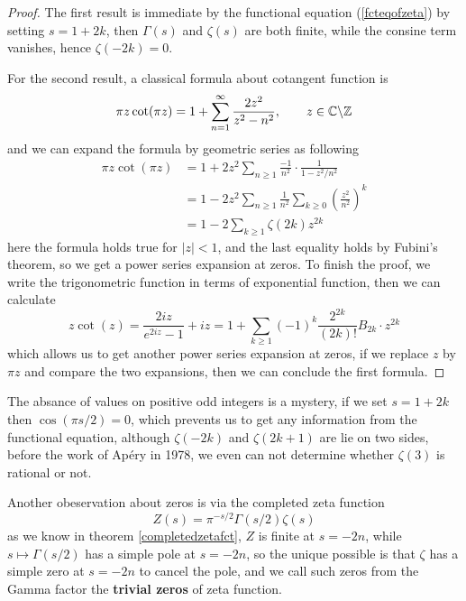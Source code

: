 \begin{proof}
    The first result is immediate by the functional equation (\ref{fcteqofzeta}) by setting \(s = 1+2k\), then \(\Gamma(s)\) and \(\zeta(s)\) are both finite, while the consine term vanishes, hence \(\zeta(-2k) = 0\). 
    
    For the second result, a classical formula about cotangent function is
    \[\pi z \cot(\pi z) = 1 + \sum_{n=1}^\infty \frac{2z^2}{z^2 - n^2}, \qquad z \in \mathbb{C} \backslash  \mathbb{Z}\]
    and we can expand the formula by geometric series as following
    \begin{align*}
        \pi z \cot(\pi z) &= 1 + 2z^2 \sum_{n\geq 1} \frac{-1}{n^2} \cdot \frac{1}{1 - z^2/n^2} \\
        &= 1 - 2z^2 \sum_{n\geq 1} \frac{1}{n^2} \sum_{k\geq 0} \left(\frac{z^2}{n^2}\right)^k \\
        &= 1 - 2 \sum_{k \geq 1} \zeta(2k) z^{2k}
    \end{align*}
    here the formula holds true for $|z|<1$, and the last equality holds by Fubini's theorem, so we get a power series expansion at zeros. To finish the proof, we write the trigonometric function in terms of exponential function, then we can calculate
    \[z \cot(z) = \frac{2iz}{e^{2iz} - 1} + iz = 1+ \sum_{k \geq 1} (-1)^k \frac{2^{2k}}{(2k)!}B_{2k} \cdot z^{2k}\]
    which allows us to get another power series expansion at zeros, if we replace $z$ by $\pi z$ and compare the two expansions, then we can conclude the first formula.
\end{proof}

\begin{remark}
    The absance of values on positive odd integers is a mystery, if we set \(s = 1+2k\) then \(\cos(\pi s/2)= 0\), which prevents us to get any information from the functional equation, although \(\zeta(-2k)\) and \(\zeta(2k+1)\) are lie on two sides, before the work of Apéry in 1978, we even can not determine whether \(\zeta(3)\) is rational or not.
\end{remark}

\begin{remark}
    Another obeservation about zeros is via the completed zeta function
    \[Z(s) = \pi^{-s/2} \Gamma(s/2) \zeta(s)\]
    as we know in theorem \ref{completedzetafct}, \(Z\) is finite at \(s = -2n\), while \(s \mapsto \Gamma(s/2)\) has a simple pole at \(s = -2n\), so the unique possible is that \(\zeta\) has a simple zero at \(s= -2n\) to cancel the pole, and we call such zeros from the Gamma factor the \textbf{trivial zeros} of zeta function.
\end{remark}


